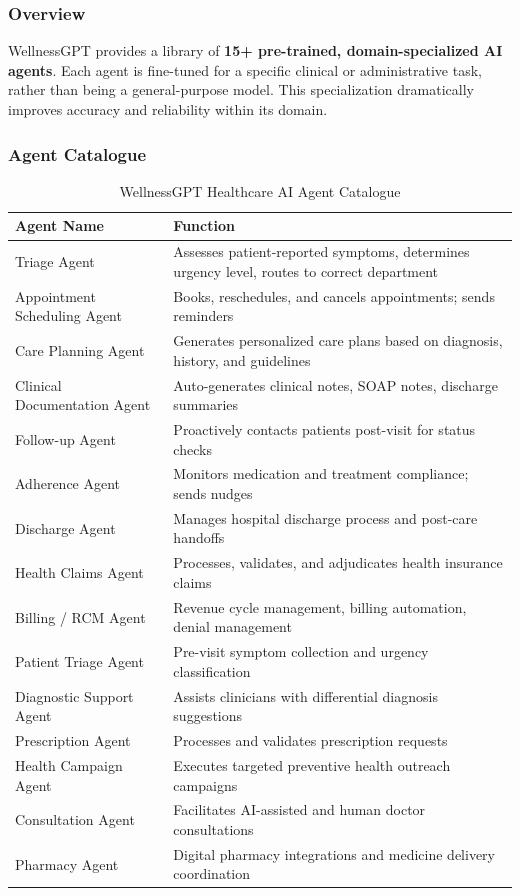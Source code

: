 \documentclass[12pt,a4paper]{article}
\begin{document}
\subsubsection{Overview}

WellnessGPT provides a library of \textbf{15+ pre-trained, domain-specialized AI agents}. Each agent is fine-tuned for a specific clinical or administrative task, rather than being a general-purpose model. This specialization dramatically improves accuracy and reliability within its domain.

\subsubsection{Agent Catalogue}

\begin{table}[H]
\centering
\renewcommand{\arraystretch}{1.3}
\begin{tabularx}{\textwidth}{lX}
\toprule
\textbf{Agent Name} & \textbf{Function} \\
\midrule
Triage Agent          & Assesses patient-reported symptoms, determines urgency level, routes to correct department \\
Appointment Scheduling Agent & Books, reschedules, and cancels appointments; sends reminders \\
Care Planning Agent   & Generates personalized care plans based on diagnosis, history, and guidelines \\
Clinical Documentation Agent & Auto-generates clinical notes, SOAP notes, discharge summaries \\
Follow-up Agent       & Proactively contacts patients post-visit for status checks \\
Adherence Agent       & Monitors medication and treatment compliance; sends nudges \\
Discharge Agent       & Manages hospital discharge process and post-care handoffs \\
Health Claims Agent   & Processes, validates, and adjudicates health insurance claims \\
Billing / RCM Agent   & Revenue cycle management, billing automation, denial management \\
Patient Triage Agent  & Pre-visit symptom collection and urgency classification \\
Diagnostic Support Agent & Assists clinicians with differential diagnosis suggestions \\
Prescription Agent    & Processes and validates prescription requests \\
Health Campaign Agent & Executes targeted preventive health outreach campaigns \\
Consultation Agent    & Facilitates AI-assisted and human doctor consultations \\
Pharmacy Agent        & Digital pharmacy integrations and medicine delivery coordination \\
\bottomrule
\end{tabularx}
\caption{WellnessGPT Healthcare AI Agent Catalogue}
\end{table}
\end{document}
